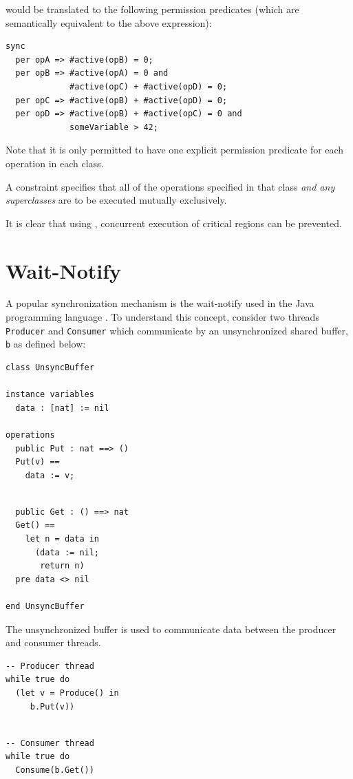 \documentclass{overturerepchap}
\begin{document}
\noindent
would be translated to the following permission predicates (which are
semantically equivalent to the above expression):

\begin{lstlisting}
sync
  per opA => #active(opB) = 0;
  per opB => #active(opA) = 0 and
             #active(opC) + #active(opD) = 0;
  per opC => #active(opB) + #active(opD) = 0;
  per opD => #active(opB) + #active(opC) = 0 and
             someVariable > 42;
\end{lstlisting}

Note that it is only permitted to have one explicit permission predicate for
each operation in each class.

A {\bf{}} constraint specifies that all of the operations
specified in that class \emph{and any superclasses} are to be executed
mutually exclusively.

It is clear that using {\bf{}}, concurrent execution of critical regions
can be prevented.

\section{Wait-Notify}\label{sec:waitnotify}

A popular synchronization mechanism is the wait-notify used in the
Java programming language \cite{Gosling&00}. To understand this
concept, consider two threads \texttt{Producer} and 
\texttt{Consumer} which communicate
by an unsynchronized shared buffer, \texttt{b} as defined below:

\begin{multicols}{2}
\begin{lstlisting}
class UnsyncBuffer

instance variables
  data : [nat] := nil

operations
  public Put : nat ==> ()
  Put(v) ==
    data := v;
\end{lstlisting}
\begin{lstlisting}

  public Get : () ==> nat
  Get() ==
    let n = data in
      (data := nil;
       return n)
  pre data <> nil

end UnsyncBuffer
\end{lstlisting}
\end{multicols}

The unsynchronized buffer is used to communicate data between the producer and
consumer threads.

\begin{multicols}{2}
\begin{lstlisting}
-- Producer thread
while true do
  (let v = Produce() in
     b.Put(v))
\end{lstlisting}
\begin{lstlisting}

-- Consumer thread
while true do
  Consume(b.Get())
\end{lstlisting}
\end{multicols}
\end{document}
